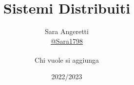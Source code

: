 \documentclass[12pt, a4paper, openany]{book}
\begin{document}
\title{Sistemi Distribuiti}
\author{
	Sara Angeretti  \\
	\small{\href{https://t.me/Sara1798}{@Sara1798}}
	\\\\Chi vuole si aggiunga
}
\date{2022/2023}
\maketitle

\tableofcontents


\end{document}
